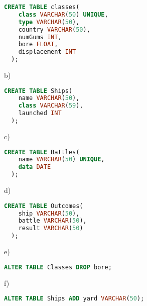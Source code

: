 \begin{lstlisting}[language=sql]
  CREATE TABLE classes(
    class VARCHAR(50) UNIQUE,
    type VARCHAR(50),
    country VARCHAR(50),
    numGums INT,
    bore FLOAT,
    displacement INT
  );
\end{lstlisting}

b)

\begin{lstlisting}[language=sql]
  CREATE TABLE Ships(
    name VARCHAR(50),
    class VARCHAR(59),
    launched INT
  );
\end{lstlisting}

c)

\begin{lstlisting}[language=sql]
  CREATE TABLE Battles(
    name VARCHAR(50) UNIQUE,
    data DATE
  );
\end{lstlisting}

d)

\begin{lstlisting}[language=sql]
  CREATE TABLE Outcomes(
    ship VARCHAR(50),
    battle VARCHAR(50),
    result VARCHAR(50)
  );
\end{lstlisting}

e)

\begin{lstlisting}[language=sql]
  ALTER TABLE Classes DROP bore;
\end{lstlisting}

f)

\begin{lstlisting}[language=sql]
  ALTER TABLE Ships ADD yard VARCHAR(50);
\end{lstlisting}
